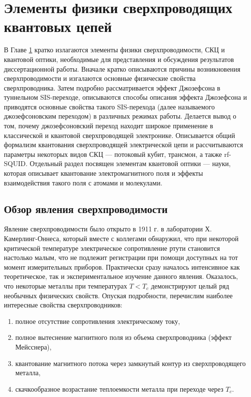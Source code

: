 \chapter{Элементы физики сверхпроводящих квантовых цепей} \label{c1}

В Главе \ref{c1} кратко излагаются элементы физики сверхпроводимости, СКЦ и квантовой оптики, необходимые для представления и обсуждения результатов диссертационной работы. Вначале кратко описываются причины возникновения сверхпроводимости и изгалаются основные физические свойства сверхпроводника. Затем подробно рассматривается эффект Джозефсона в туннельном SIS-переходе, описываются способы описания эффекта Джозефсона и приводятся основные свойства такого SIS-перехода (далее называемого джозефсоновским переходом) в различных режимах работы. Делается вывод о том, почему джозефсоновский переход находит широкое применение в классической и квантовой сверхпроводящей электронике. Описывается общий формализм квантования сверхпроводящей электрической цепи и рассчитываются параметры некоторых видов СКЦ --- потоковый кубит, трансмон, а также rf-SQUID. 
Отдельный раздел посвящен элементам квантовой оптики --- науки, которая описывает квантование электромагнитного поля и эффекты взаимодействия такого поля с атомами и молекулами. 
\section{Обзор явления сверхпроводимости} \label{s1_sc_phys}
Явление сверхпроводимости было открыто в 1911 г. в лаборатории Х. Камерлинг-Оннеса, который вместе с коллегами обнаружил, что при некоторой критической температуре электрическое сопротивление ртути становится настолько малым, что не подлежит регистрации при помощи доступных на тот момент измерительных приборов. Практически сразу началось интенсивное как теоретическое, так и экспериментальное изучение данного явления. Оказалось, что некоторые металлы при температурах $T<T_c$ демонстрируют целый ряд необычных физических свойств. Опуская подробности, перечислим наиболее интересные свойства сверхпроводников:
\begin{enumerate}
	\item полное отсутствие сопротивления электрическому току,
	\item полное вытеснение магнитного поля из объема сверхпроводника (эффект Мейсснера),
	\item квантование магнитного потока через замкнутый контур из сверхпроводящего металла,
	\item скачкообразное возрастание теплоемкости металла при переходе через $T_c$.
\end{enumerate}	

